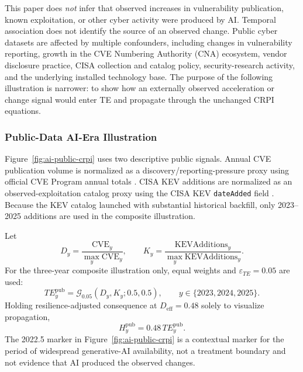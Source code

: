 \documentclass[11pt]{article}
\begin{document}
This paper does \emph{not} infer that observed increases in vulnerability publication,
known exploitation, or other cyber activity were produced by AI. Temporal association
does not identify the source of an observed change. Public cyber datasets are affected by multiple confounders,
including changes in vulnerability reporting, growth in the CVE Numbering Authority
(CNA) ecosystem, vendor disclosure practice, CISA collection and catalog policy,
security-research activity, and the underlying installed technology base. The purpose
of the following illustration is narrower: to show how an externally observed
acceleration or change signal would enter TE and propagate through the unchanged CRPI
equations.

\subsubsection{Public-Data AI-Era Illustration}
Figure~\ref{fig:ai-public-crpi} uses two descriptive public signals. Annual CVE
publication volume is normalized as a discovery/reporting-pressure proxy using official
CVE Program annual totals \cite{cve-metrics}. CISA KEV additions are normalized as an
observed-exploitation catalog proxy using the CISA KEV \texttt{dateAdded} field
\cite{cisa-kev,cisa-kev-data}. Because the KEV catalog launched with substantial
historical backfill, only 2023--2025 additions are used in the composite illustration.

Let
\begin{equation}
  D_y=\frac{\mathrm{CVE}_y}{\max_y\mathrm{CVE}_y},
  \qquad
  K_y=\frac{\mathrm{KEVAdditions}_y}{\max_y\mathrm{KEVAdditions}_y}.
\end{equation}
For the three-year composite illustration only, equal weights and
$\varepsilon_{TE}=0.05$ are used:
\begin{equation}
  TE^{\mathrm{pub}}_y=
  \mathcal{G}_{0.05}\left(D_y,K_y;0.5,0.5\right),
  \qquad y\in\{2023,2024,2025\}.
\end{equation}
Holding resilience-adjusted consequence at $D_{\mathrm{eff}}=0.48$ solely to visualize
propagation,
\begin{equation}
  H^{\mathrm{pub}}_y=0.48\,TE^{\mathrm{pub}}_y.
\end{equation}
The 2022.5 marker in Figure~\ref{fig:ai-public-crpi} is a contextual marker for the period
of widespread generative-AI availability, not a treatment boundary and not evidence that
AI produced the observed changes.
\end{document}
